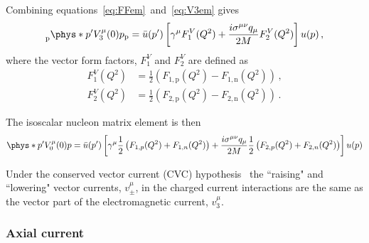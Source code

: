     Combining equations~\ref{eq:FFem}~and~\ref{eq:V3em} gives
    \begin{equation}
      \prescript{}{\textrm{p}}{\phys*{p'}{V^{\mu}_3(0)}{p}}_{\textrm{p}} 
        = \bar{u}(p') \left[\gamma^{\mu}F_1^V(Q^2) 
          + \frac{i\sigma^{\mu\nu}q_{\mu}}{2M}F_2^V(Q^2)\right] u(p) \,,
    \end{equation}
    where the vector form factors, $F_1^V$ and $F_2^V$ are defined as
    \begin{equation}
      \begin{aligned}
        F_1^V(Q^2) &= \frac{1}{2}\left( F_{1,\textrm{p}}(Q^2) - F_{1,\textrm{n}}(Q^2)\right) \,, \\
        F_2^V(Q^2) &= \frac{1}{2}\left( F_{2,\textrm{p}}(Q^2) - F_{2,\textrm{n}}(Q^2)\right) \,.
      \end{aligned}
    \end{equation}

    The isoscalar nucleon matrix element is then
    \begin{equation}
      {\phys*{p'}{V^{\mu}_0(0)}{p}}
      = \bar{u}(p')\left[\gamma^{\mu}\frac{1}{2}\left(F_{1,p}(Q^2) + F_{1,n}(Q^2)\right) 
        + \frac{i\sigma^{\mu\nu}q_{\mu}}{2M}\frac{1}{2}\left(F_{2,p}(Q^2) + F_{2,n}(Q^2)\right)\right]u(p)
    \end{equation}
 
    Under the conserved vector current (CVC)
  hypothesis~\cite{Gerstein:1956,Feynman:1958ty} the ``raising" and ``lowering"
  vector currents, $v^{\mu}_{\pm}$, in the charged current interactions are the
  same as the vector part of the electromagnetic current, $v^{\mu}_{3}$.

  \subsubsection{Axial current}

